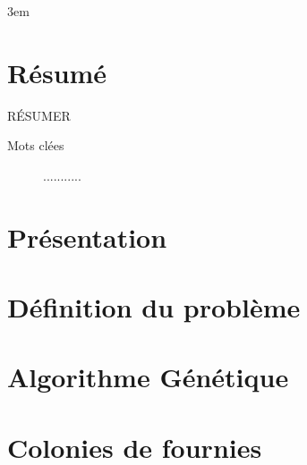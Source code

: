 \documentclass{librairies/lib}
\begin{document}
    \emergencystretch 3em

    


    \newpage
    \pagestyle{no_number}
    \section*{Résumé}


    RÉSUMER
    \begin{description}
        \item[Mots clées] ...........
    \end{description}

    \newpage



    \tableofcontents
    \newpage



    \pagestyle{number}


    \section{Présentation}\label{sec:presentation}

    


    \newpage



    \section{Définition du problème}\label{sec:definition-du-probleme}

    


    \newpage

    \section{Algorithme Génétique}\label{sec:algorithme-genetique}

    


    \newpage


    \section{Colonies de fournies}\label{sec:colonies-de-fournies}
\end{document}
